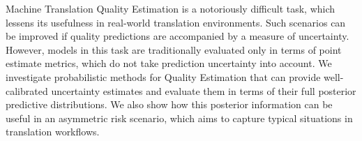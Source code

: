 Machine Translation Quality Estimation is a notoriously difficult task, which lessens its usefulness in real-world translation environments. Such scenarios can be improved if quality predictions are accompanied by a measure of uncertainty. However, models in this task are traditionally evaluated only in terms of point estimate metrics, which do not take prediction uncertainty into account. We investigate probabilistic methods for Quality Estimation that can provide well-calibrated uncertainty estimates and evaluate them in terms of their full posterior predictive distributions. We also show how this posterior information can be useful in an asymmetric risk scenario, which aims to capture typical situations in translation workflows.
